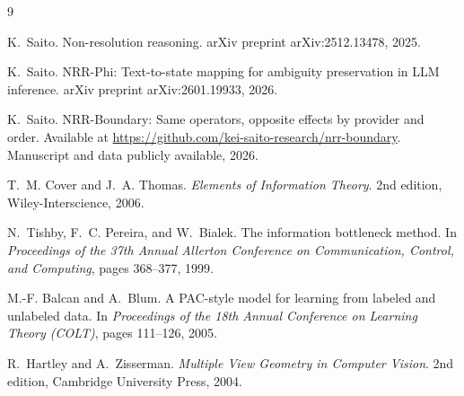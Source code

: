 \documentclass[11pt,a4paper]{article}
\begin{document}
\begin{thebibliography}{9}

K.~Saito.
\newblock Non-resolution reasoning.
\newblock arXiv preprint arXiv:2512.13478, 2025.

K.~Saito.
\newblock NRR-Phi: Text-to-state mapping for ambiguity preservation in LLM inference.
\newblock arXiv preprint arXiv:2601.19933, 2026.

K.~Saito.
\newblock NRR-Boundary: Same operators, opposite effects by provider and order.
\newblock Available at \url{https://github.com/kei-saito-research/nrr-boundary}. Manuscript and data publicly available, 2026.

T.~M. Cover and J.~A. Thomas.
\newblock \emph{Elements of Information Theory}.
\newblock 2nd edition, Wiley-Interscience, 2006.

N.~Tishby, F.~C. Pereira, and W.~Bialek.
\newblock The information bottleneck method.
\newblock In \emph{Proceedings of the 37th Annual Allerton Conference on Communication, Control, and Computing}, pages 368--377, 1999.

M.-F. Balcan and A.~Blum.
\newblock A {PAC}-style model for learning from labeled and unlabeled data.
\newblock In \emph{Proceedings of the 18th Annual Conference on Learning Theory (COLT)}, pages 111--126, 2005.

R.~Hartley and A.~Zisserman.
\newblock \emph{Multiple View Geometry in Computer Vision}.
\newblock 2nd edition, Cambridge University Press, 2004.

\end{thebibliography}
\end{document}
